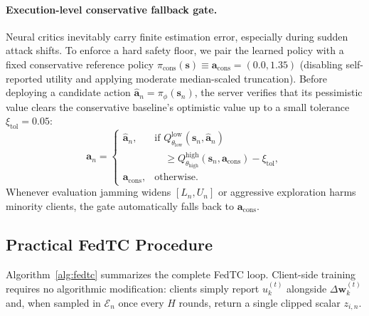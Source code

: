 \paragraph{Execution-level conservative fallback gate.}
Neural critics inevitably carry finite estimation error, especially during sudden attack shifts. To enforce a hard safety floor, we pair the learned policy with a fixed conservative reference policy $\pi_{\mathrm{cons}}(\mathbf{s}) \equiv \mathbf{a}_{\mathrm{cons}} = (0.0, 1.35)$ (disabling self-reported utility and applying moderate median-scaled truncation). Before deploying a candidate action $\hat{\mathbf{a}}_n = \pi_\phi(\mathbf{s}_n)$, the server verifies that its pessimistic value clears the conservative baseline's optimistic value up to a small tolerance $\xi_{\mathrm{tol}} = 0.05$:
\begin{equation}
    \mathbf{a}_n = \begin{cases}
        \hat{\mathbf{a}}_n, & \text{if } Q_{\theta_{\mathrm{low}}}^{\mathrm{low}}(\mathbf{s}_n, \hat{\mathbf{a}}_n) \\
        & \quad \ge Q_{\theta_{\mathrm{high}}}^{\mathrm{high}}(\mathbf{s}_n, \mathbf{a}_{\mathrm{cons}}) - \xi_{\mathrm{tol}}, \\
        \mathbf{a}_{\mathrm{cons}}, & \text{otherwise.}
    \end{cases}
    \label{eq:fallback_gate}
\end{equation}
Whenever evaluation jamming widens $[L_n, U_n]$ or aggressive exploration harms minority clients, the gate automatically falls back to $\mathbf{a}_{\mathrm{cons}}$.

\subsection{Practical FedTC Procedure}
\label{sec:practical_fedtc}

Algorithm~\ref{alg:fedtc} summarizes the complete FedTC loop. Client-side training requires no algorithmic modification: clients simply report $u_k^{(t)}$ alongside $\Delta\mathbf{w}_k^{(t)}$ and, when sampled in $\mathcal{E}_n$ once every $H$ rounds, return a single clipped scalar $z_{i,n}$.

